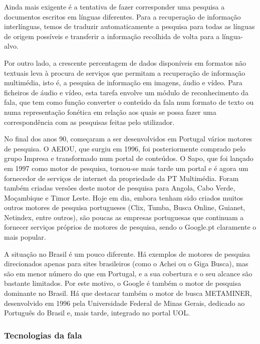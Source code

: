 \begin{multicols}{2}
Ainda mais exigente é a tentativa de fazer cor\-res\-pon\-der uma pesquisa a documentos escritos em línguas diferentes. Para a recuperação de informação interlínguas, temos de traduzir automaticamente a pesquisa para todas as línguas de origem possíveis e transferir a informação recolhida de volta para a língua-alvo. 

Por outro lado, a crescente percentagem de dados disponíveis em formatos não textuais leva à procura de serviços que permitam a recuperação de informação multimédia, isto é, a pesquisa de informação em imagens, áudio e vídeo. Para ficheiros de áudio e vídeo, esta tarefa envolve um módulo de reconhecimento da fala, que tem como função converter o conteúdo da fala num formato de texto ou numa representação fonética em relação aos quais se possa fazer uma correspondência com as pesquisas feitas pelo utilizador.

No final dos anos 90, começaram a ser desenvolvidos em Portugal vários motores de pesquisa. O AEIOU, que surgiu em 1996, foi posteriormente comprado pelo grupo Impresa e transformado num portal de conteúdos\cite{aeiou}. O Sapo, que foi lançado em 1997 como motor de pesquisa, tornou-se mais tarde um portal e é agora um fornecedor de serviços de internet da propriedade da PT Multimédia\cite{sapo}. Foram também criadas versões deste motor de pesquisa para Angola, Cabo Verde, Moçambique e Timor Leste. Hoje em dia, embora tenham sido criados muitos outros motores de pesquisa portugueses (Clix, Tumba, Busca Online, Guianet, Netindex, entre outros)\cite{colossus}, são poucas as empresas portuguesas que continuam a fornecer serviços próprios de motores de pesquisa, sendo o Google.pt claramente o mais popular.

A situação no Brasil é um pouco diferente. Há exemplos de motores de pesquisa direcionados apenas para sites brasileiros (como o Achei\cite{achei} ou o Giga Busca\cite{busca}), mas são em menor número do que em Portugal, e a sua cobertura e o seu alcance são bastante limitados. Por este motivo, o Google é também o motor de pesquisa dominante no Brasil. Há que destacar também o motor de busca METAMINER, desenvolvido em 1996 pela Universidade Federal de Minas Gerais, dedicado ao Português do Brasil e, mais tarde, integrado no portal UOL.
  
\subsubsection{Tecnologias da fala}


\end{multicols}
